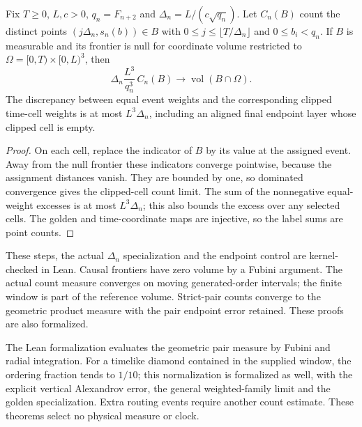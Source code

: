 \begin{proposition}
\label{prop:source-golden-event-count}
Fix $T\ge0$, $L,c>0$, $q_n=F_{n+2}$ and
$\Delta_n=L/(c\sqrt{q_n})$. Let $C_n(B)$ count the distinct points
$(j\Delta_n,s_n(b))\in B$ with $0\le j\le\lfloor T/\Delta_n\rfloor$
and $0\le b_i<q_n$. If $B$ is measurable and its frontier is null for
coordinate volume restricted to $\Omega=[0,T)\times[0,L)^3$, then
\[
 \Delta_n\frac{L^3}{q_n^3}\,C_n(B)
 \longrightarrow \operatorname{vol}(B\cap\Omega).
\]
The discrepancy between equal event weights and the corresponding clipped
time-cell weights is at most $L^3\Delta_n$, including an aligned final
endpoint layer whose clipped cell is empty.
\end{proposition}
\begin{proof}
On each cell, replace the indicator of $B$ by its value at the assigned
event. Away from the null frontier these indicators converge pointwise,
because the assignment distances vanish. They are bounded by one, so
dominated convergence gives the clipped-cell count limit. The sum of the
nonnegative equal-weight excesses is at most $L^3\Delta_n$; this also
bounds the excess over any selected cells. The golden and time-coordinate
maps are injective, so the label sums are point counts.
\end{proof}
These steps, the actual $\Delta_n$ specialization and the endpoint control
are kernel-checked in Lean.
Causal frontiers have zero volume by a Fubini argument. The actual count measure
converges on moving generated-order intervals; the finite window is part of
the reference volume. Strict-pair counts converge to the geometric product
measure with the pair endpoint error retained. These proofs are also
formalized.

The Lean formalization evaluates the geometric
pair measure by Fubini and radial integration. For a timelike diamond
contained in the supplied window, the ordering fraction tends to $1/10$;
this normalization is formalized as well, with the explicit vertical
Alexandrov error, the general weighted-family limit and the golden
specialization. Extra
routing events require another count estimate. These theorems select no
physical measure or clock.

